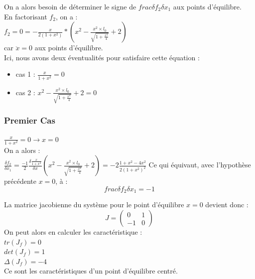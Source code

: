 \documentclass[10pt,a4paper]{article}
\begin{document}
On a alors besoin de déterminer le signe de $frac{\delta f_2}{\delta x_1}$ aux points d'équilibre.\\

En factorisant $f_2$, on a : \\
$f_2=0=-\frac{x}{2(1+x^2)}*(x^2-\frac{x^2\times l_0}{\sqrt{1+\frac{x^4}{4}}}+2)$\\
car $\ddot{x} = 0$ aux points d'équilibre.\\

Ici, nous avons deux éventualités pour satisfaire cette équation :\\
\begin{itemize}
\item cas 1 : $\frac{x}{1+x^2}=0$\\
\item cas 2 : $x^2-\frac{x^2\times l_0}{\sqrt{1+\frac{x^4}{4}}}+2=0$\\
\end{itemize}

\subsubsection*{Premier Cas}
$\frac{x}{1+x^2}=0 \longrightarrow x=0$\\
On a alors :\\
$\frac{\delta f_2}{\delta x_1}=\frac{-1}{2}\frac{\delta \frac{x}{1+x^2}}{\delta x}(x^2 - \frac{x^2\times l_0}{\sqrt{1+\frac{x^4}{4}}}+2)=-2\frac{1+x^2-4x^2}{2(1+x^2)^2}$
Ce qui équivaut, avec l'hypothèse précédente $x=0$, à :\\
\[frac{\delta f_2}{\delta x_1}=-1\]

La matrice jacobienne du système pour le point d'équilibre $x=0$ devient donc :\\
\[
J=
\begin{pmatrix}
0&1\\
-1&0
\end{pmatrix}
\]
On peut alors en calculer les caractéristique :\\
$tr(J_f) = 0 $\\
$det(J_f) =  1 $\\
$\Delta(J_f) = -4$\\
Ce sont les caractéristiques d'un point d'équilibre centré.\\
\end{document}
